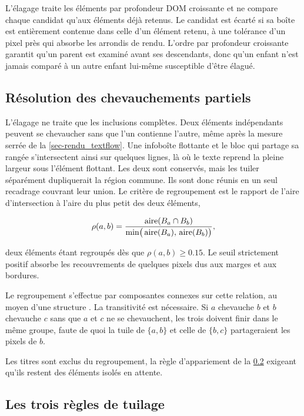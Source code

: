L'élagage traite les éléments par profondeur DOM croissante et ne compare
chaque candidat qu'aux éléments déjà retenus. Le candidat est écarté si sa
boîte est entièrement contenue dans celle d'un élément retenu, à une tolérance
d'un pixel près qui absorbe les arrondis de rendu. L'ordre par profondeur
croissante garantit qu'un parent est examiné avant ses descendants, donc qu'un
enfant n'est jamais comparé à un autre enfant lui-même susceptible d'être
élagué.

\subsection{Résolution des chevauchements partiels}
\label{sec-tuilage_chevauchement}

L'élagage ne traite que les inclusions complètes. Deux éléments indépendants
peuvent se chevaucher sans que l'un contienne l'autre, même après la mesure
serrée de la \cref{sec-rendu_textflow}. Une infoboîte flottante et le bloc qui
partage sa rangée s'intersectent ainsi sur quelques lignes, là où le texte
reprend la pleine largeur sous l'élément flottant. Les deux sont conservés,
mais les tuiler séparément dupliquerait la région commune. Ils sont donc réunis
en un seul recadrage couvrant leur union. Le critère de regroupement est le
rapport de l'aire d'intersection à l'aire du plus petit des deux éléments,

\begin{equation}
\rho(a, b) = \frac{\operatorname{\text{\normalfont aire}}(B_a \cap B_b)}
                  {\min\!\big(\operatorname{\text{\normalfont aire}}(B_a),\, \operatorname{\text{\normalfont aire}}(B_b)\big)},
\label{eq-overlap}
\end{equation}

deux éléments étant regroupés dès que $\rho(a,b) \geq \num{0.15}$. Le seuil
strictement positif absorbe les recouvrements de quelques pixels dus aux marges
et aux bordures.

Le regroupement s'effectue par composantes connexes sur cette relation, au
moyen d'une structure . La transitivité est nécessaire. Si
$a$ chevauche $b$ et $b$ chevauche $c$ sans que $a$ et $c$ ne se chevauchent,
les trois doivent finir dans le même groupe, faute de quoi la tuile de
$\{a,b\}$ et celle de $\{b,c\}$ partageraient les pixels de $b$.

Les titres sont exclus du regroupement, la règle d'appariement de la
\cref{sec-tuilage_regles} exigeant qu'ils restent des éléments isolés en
attente.

\subsection{Les trois règles de tuilage}
\label{sec-tuilage_regles}

